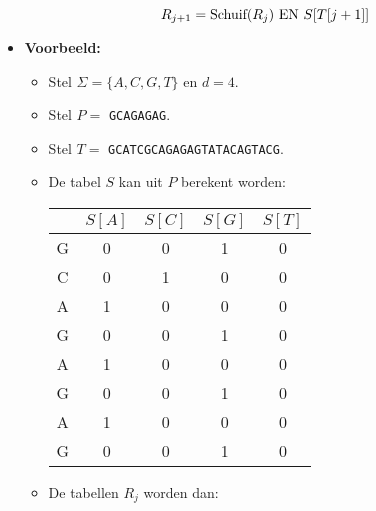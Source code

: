 \begin{itemize}
    $$R_{j + 1} = \hbox{Schuif}(R_j) \hbox{ EN } S[T[j + 1]]$$

    \item \textbf{Voorbeeld:}
    \begin{itemize}
        \item Stel $\Sigma = \{A, C, G, T\}$ en $d = 4$.
        \item Stel $P = $ \texttt{GCAGAGAG}.
        \item Stel $T = $ \texttt{GCATCGCAGAGAGTATACAGTACG}.
        \item De tabel $S$ kan uit $P$ berekent worden:
        \begin{table}[ht]
            \centering
            \begin{tabular}{|c | c c c c |}
                \hline
                & $S[A]$ & $ S[C]$ & $ S[G]$ & $S[T]$ \\
                \hline
                G & 0 & 0 & 1 & 0 \\
                C & 0 & 1 & 0 & 0 \\
                A & 1 & 0 & 0 & 0 \\
                G & 0 & 0 & 1 & 0 \\
                A & 1 & 0 & 0 & 0 \\
                G & 0 & 0 & 1 & 0 \\
                A & 1 & 0 & 0 & 0 \\
                G & 0 & 0 & 1 & 0 \\
                \hline
            \end{tabular}
        \end{table}
        \item De tabellen $R_j$ worden dan:

        \begin{table}[ht]
            \centering
            \scalebox{0.6}{
            
}
\end{table}
\end{itemize}
\end{itemize}
